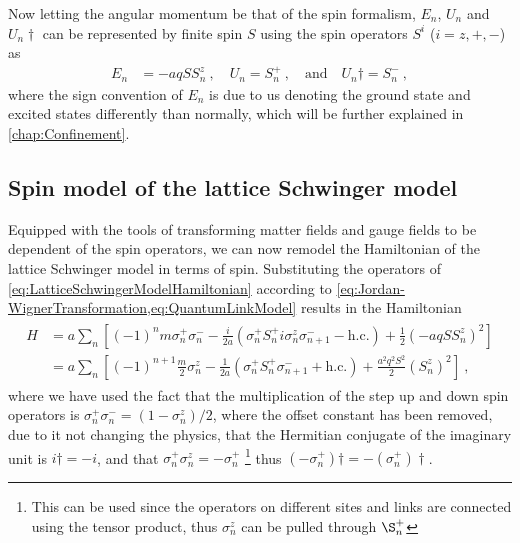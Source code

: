 \documentclass[../main.tex]{subfiles} %
\begin{document}
Now letting the angular momentum be that of the spin formalism, $E_n$, $U_n$ and $U_n\dagger$ can be represented by finite spin $S$ using the spin operators $S^i$ ($i=z,+,-$) as
\begin{align} \label{eq:QuantumLinkModel}
    E_n &= - aq S S_n^z \: , \quad
    U_n = S_n^+ \: , \quad \text{and} \quad
    U_n\dagger = S_n^- \: ,
\end{align}
where the sign convention of $E_n$ is due to us denoting the ground state and excited states differently than normally, which will be further explained in \cref{chap:Confinement}.



\subsection{Spin model of the lattice Schwinger model}

Equipped with the tools of transforming matter fields and gauge fields to be dependent of the spin operators, we can now remodel the Hamiltonian of the lattice Schwinger model in terms of spin. Substituting the operators of \cref{eq:LatticeSchwingerModelHamiltonian} according to \cref{eq:Jordan-WignerTransformation,eq:QuantumLinkModel} results in the Hamiltonian
\begin{align} \label{eq:LatticeSchwingerModelHamiltonianSpin}
\begin{split}
    H &= a \sum_n \left[ (-1)^n m \sigma_n^+ \sigma_n^- - \frac{i}{2a} \left( \sigma_n^+ S_n^+ i \sigma_n^z \sigma_{n+1}^- - \mathrm{h.c.} \right) + \frac{1}{2} \left( - aq S S_n^z \right)^2 \right] \\
        &= a \sum_n \left[ (-1)^{n+1} \frac{m}{2} \sigma_n^z - \frac{1}{2a} \left( \sigma_n^+ S_n^+ \sigma_{n+1}^- + \mathrm{h.c.} \right) + \frac{a^2 q^2 S^2}{2} \left( S_n^z \right)^2 \right] \: ,
\end{split}
\end{align}
where we have used the fact that the multiplication of the step up and down spin operators is $\sigma_n^+ \sigma_n^- = (1 - \sigma_n^z)/2$, where the offset constant has been removed, due to it not changing the physics, that the Hermitian conjugate of the imaginary unit is $i\dagger = -i$, and that $\sigma_n^+ \sigma_n^z = -\sigma_n^+$ \footnote{This can be used since the operators on different sites and links are connected using the tensor product, thus $\sigma_n^z$ can be pulled through $\S_n^+$} thus $(-\sigma_n^+)\dagger = - (\sigma_n^+)\dagger$.
\end{document}
